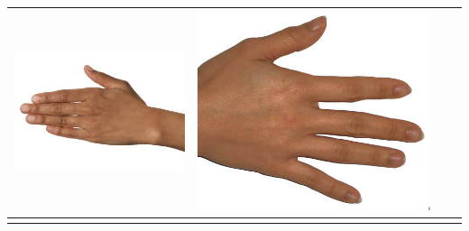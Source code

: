 \begin{longtable}{|N||c|c|c|}
  \begin{minipage}{.29\textwidth}
    \includegraphics[width=\textwidth,height=\textheight,keepaspectratio]{../inputs/hand_brown.jpg}
  \end{minipage} & 
  \begin{minipage}{.29\textwidth}
    \includegraphics[width=\textwidth,height=\textheight,keepaspectratio]{../rc_test/outputs/20170516_proportional_test/hand_light_to_hand_brown.jpg}
  \end{minipage} \\
\hline  \label{row:prop_test_hand_light_to_hand_pale} &
  \begin{minipage}{.29\textwidth}

\end{minipage}
\end{longtable}

